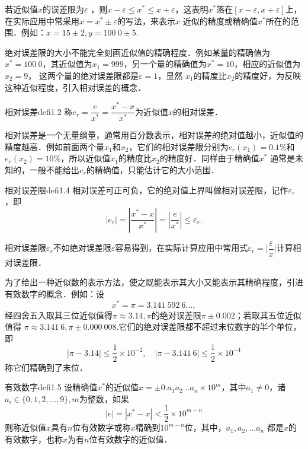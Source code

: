 若近似值$x$的误差限为$\varepsilon$ ，则$x-\varepsilon\leqslant  x^*
\leqslant
x+\varepsilon$，这表明$x^*$落在$[x-\varepsilon,x+\varepsilon]$上，在实际应用中常采用$x=x^*\pm\varepsilon$的写法，来表示$x$
近似的精度或精确值$x^*$所在的范围．例如：$x=15\pm2,y=100\ 0\pm5$.

绝对误差限的大小不能完全刻画近似值的精确程度．例如某量的精确值为$x^*=100\ 0$，其近似值为$x_1=999$，另一个量的精确值为$x^*=10$，相应的近似值为$x_2=9$，
这两个量的绝对误差限都是$\varepsilon=1$，显然
$x_1$的精度比$x_2$的精度好，为反映这种近似程度，引入相对误差的概念．
\begin{defi}{相对误差}{defi1.2}
称$e_r=\dfrac{e}{x^*}=\dfrac{x^*-x}{x^*}$为近似值$x$的相对误差．
\end{defi}

相对误差是一个无量纲量，通常用百分数表示，相对误差的绝对值越小，近似值的精度越高．例如前面两个量$x_1$和$x_2$，它们的相对误差限分别为$e_r(x_1)=0.1\%$和$e_r(x_2)=10\%$，所以近似值$x_1$的精度比$x_2$的精度好．同样由于精确值$x^*$
通常是未知的，一般不能给出$e_r$的精确值，只能估计它的大小范围．
\begin{defi}{相对误差限}{defi1.4}
相对误差可正可负，它的绝对值上界叫做相对误差限，记作$\varepsilon_r$ ，即
\begin{equation}\label{equ1.7}
|e_r|=\left|\frac{x^*-x}{x^*}\right|=\left|\frac{e}{x^*}\right|\leqslant\varepsilon_r.
\end{equation}
\end{defi}

相对误差限$\varepsilon_r$不如绝对误差限$\varepsilon$容易得到，在实际计算应用中常用式$\varepsilon_r=\Big|\dfrac{\varepsilon}{x}\Big|$计算相对误差限．

为了给出一种近似数的表示方法，使之既能表示其大小又能表示其精确程度，引进有效数字的概念．例如：设
$$x^*=\pi=3.141\ 592\ 6\ldots,$$
经四舍五入取其三位近似值得$\pi\approx3.14,\pi$的绝对误差限$\pi\pm0.002$；若取其五位近似值得
$\pi\approx3.141\ 6,\pi\pm0.000\ 008$.它们的绝对误差限都不超过末位数字的半个单位，即
$$|\pi-3.14|\leqslant \frac{1}{2}\times10^{-2},\quad|\pi-3.141\ 6|\leqslant \frac{1}{2}\times10^{-4}$$
称它们精确到了末位．
\begin{defi}{有效数字}{defi1.5}
设精确值$x^*$的近似值$x=\pm0.a_1a_2\ldots
a_n\times10^m$，其中$a_1\neq0$，诸$a_i\in\{0,1,2,\ldots,9\},m$为整数，如果
\begin{equation}\label{equ1.8}
|e|=|x^*-x|<\frac{1}{2}\times10^{m-n}
\end{equation}
则称近似值$x$具有$n$位有效数字或称$x$精确到$10^{m-n}$位，其中，$a_1,a_2,...a_n$
都是$x$的有效数字，也称$x$为有$n$位有效数字的近似值．
\end{defi}

